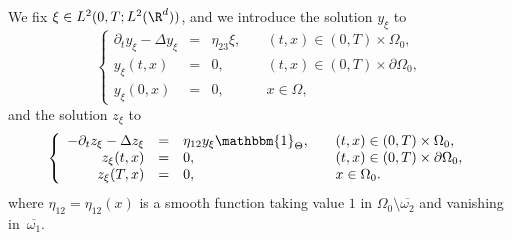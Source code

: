 We fix $\xi \in L^2(0,T; L^2(\R^d))$, and we introduce the solution $y_\xi$ to
\begin{equation*}
\left\{
\begin{array}{rcll}
\partial_t y_\xi - \Delta y_\xi &=& \eta_{23} \xi, \quad & (t,x) \in (0,T) \times \Omega_0,
\\
y_\xi(t, x) &=& 0, \quad & (t,x) \in (0,T) \times \partial \Omega_0,
\\
y_\xi(0,x) &=& 0, \quad & x \in \Omega,
\end{array}
\right.
\end{equation*}
and the solution $z_\xi$ to
\begin{equation}
\label{Heat-Eq-Adjoint-z-f}
\left\{
\begin{array}{rcll}
- \partial_t z_\xi - \Delta z_\xi & =& \eta_{12} y_\xi \mathbbm{1}_{\Theta}, \quad & (t,x) \in (0,T) \times \Omega_0,
\\
z_\xi(t, x) &=& 0, \quad & (t,x) \in (0,T) \times \partial \Omega_0,
\\
z_\xi(T,x) &=& 0, \quad & x \in \Omega_0.
\end{array}
\right.
\end{equation}
where $\eta_{12} \!=\! \eta_{12}(x)$ is a smooth function taking value $1$ in $\Omega_0 \setminus \overline{\omega_2}$ and vanishing in~$\overline{\omega_1}$.

